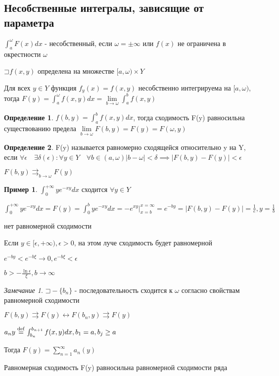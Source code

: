 \documentclass[a4paper, 12pt]{article}
\newcommand\letsymbol{\mathord{\sqsupset}}
\theoremstyle{definition}
\newtheorem*{example}{Пример}
\newtheorem*{definition}{Определение}
\theoremstyle{remark}
\newtheorem*{remark}{Замечание}
\begin{document}
\subsection{Несобственные интегралы, зависящие от параметра}
$\int_a^\omega F(x)dx$ - несобственный, если $\omega = \pm\infty$ или $f(x)$ не ограничена в окрестности $\omega$

$\letsymbol{} f(x,y)$ определена на множестве $[a, \omega)\times Y$

Для всех $y\in Y$ функция $f_y(x) = f(x,y)$ несобственно интегрируема на $[a, \omega)$, тогда $F(y) = \int_a^\omega f(x,y)dx = \lim\limits_{b\to\omega} \int_a^b f(x,y)$

\begin{definition}
     $f(b, y) = \int_a^b f(x,y) dx$, тогда сходимость F(y) равносильна существованию предела $\lim\limits_{b\to\omega}F(b, y) = F(y) = F(\omega, y)$
\end{definition}
\begin{definition}
     F(y) называется равномерно сходящейся относительно y на Y, если $\forall\epsilon \quad\exists\delta(\epsilon): \forall y\in Y \quad \forall b \in (a,\omega) |b-\omega|< \delta \implies |F(b, y) - F(y)| < \epsilon$

     $F(b, y)\rightrightarrows_{b\to \omega} F(y)$
\end{definition}

\begin{example}
     $\int_0^{+\infty} ye^{-xy}dx$ сходится $\forall y\in Y$

     $\int_0^{+\infty} ye^{-xy}dx = F(y) = \int_0^b ye^{-xy}dx = -e^{xy}{\Bigg |}_{x = b}^{x = \infty} = e^{-by} = |F(b, y) -  F(y)| = \frac{1}{e}, y = \frac{1}{b}$

     нет равномерной сходимости

     Если $y\in [\epsilon, +\infty), \epsilon > 0$, на этом луче сходимость будет равномерной

     $e^{-by}< e^{-b\xi}\to 0, e^{-b\xi}<\epsilon$
     
     $b > -\frac{\ln{\epsilon}}{\xi}, b\to\infty$
\end{example}
\begin{remark}
     $\letsymbol{} - \{b_n\}$ - последовательность сходится к $\omega$ согласно свойствам равномерной сходимости

     $F(b,y) \rightrightarrows F(y) \leftrightarrow F(b_n, y) \rightrightarrows F(y)$

     $a_n y \stackrel{\rm{def}}{=} \int_{b_n}^{b_{n+1}}f(x,y)dx, b_1 = a, b_j \geq a$

     Тогда $F(y) = \sum_{n = 1}^{\infty} a_n(y) $

     Равномерная сходимость F(y) равносильна равномерной сходимости ряда
\end{remark}
\end{document}
